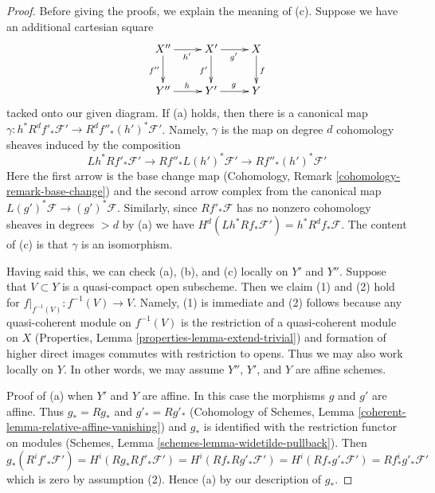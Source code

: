 \documentclass{stacks-project}
\theoremstyle{plain}
\theoremstyle{definition}
\theoremstyle{remark}
\numberwithin{equation}{subsection}
\begin{document}
\begin{proof}
Before giving the proofs, we explain the meaning of (c). Suppose
we have an additional cartesian square
$$
\xymatrix{
X'' \ar[d]_{f''} \ar[r]_{h'} &
X' \ar[d]_{f'} \ar[r]_{g'} &
X \ar[d]^f \\
Y'' \ar[r]^h &
Y' \ar[r]^g &
Y
}
$$
tacked onto our given diagram. If (a) holds, then there is a canonical
map $\gamma : h^*R^df'_*\mathcal{F}' \to R^df''_*(h')^*\mathcal{F}'$.
Namely, $\gamma$ is the map on degree $d$ cohomology sheaves
induced by the composition
$$
Lh^*Rf'_*\mathcal{F}' \longrightarrow
Rf''_*L(h')^*\mathcal{F}' \longrightarrow Rf''_*(h')^*\mathcal{F}'
$$
Here the first arrow is the base change map
(Cohomology, Remark \ref{cohomology-remark-base-change}) and
the second arrow complex from the canonical map
$L(g')^*\mathcal{F} \to (g')^*\mathcal{F}$.
Similarly, since $Rf'_*\mathcal{F}$ has no nonzero cohomology sheaves in
degrees $> d$ by (a) we have
$H^d(Lh^*Rf_*\mathcal{F}') = h^*R^df_*\mathcal{F}$.
The content of (c) is that $\gamma$ is an isomorphism.

\medskip\noindent
Having said this, we can check (a), (b), and (c) locally on $Y'$ and $Y''$.
Suppose that $V \subset Y$ is a quasi-compact open subscheme. Then we
claim (1) and (2) hold for $f|_{f^{-1}(V)} : f^{-1}(V) \to V$.
Namely, (1) is immediate and (2) follows because any quasi-coherent
module on $f^{-1}(V)$ is the restriction of a quasi-coherent module
on $X$ (Properties, Lemma \ref{properties-lemma-extend-trivial}) and formation
of higher direct images commutes with restriction to opens.
Thus we may also work locally on $Y$. In other words, we may
assume $Y''$, $Y'$, and $Y$ are affine schemes.

\medskip\noindent
Proof of (a) when $Y'$ and $Y$ are affine. In this case the morphisms
$g$ and $g'$ are affine. Thus $g_* = Rg_*$ and $g'_* = Rg'_*$
(Cohomology of Schemes, Lemma \ref{coherent-lemma-relative-affine-vanishing})
and $g_*$ is identified with the restriction functor on modules
(Schemes, Lemma \ref{schemes-lemma-widetilde-pullback}).
Then
$$
g_*(R^if'_*\mathcal{F}') = H^i(Rg_*Rf'_*\mathcal{F}') =
H^i(Rf_*Rg'_*\mathcal{F}') =
H^i(Rf_*g'_*\mathcal{F}') =
Rf^i_*g'_*\mathcal{F}'
$$
which is zero by assumption (2). Hence (a) by our description of $g_*$.


\end{proof}
\end{document}
